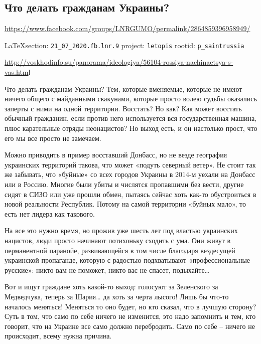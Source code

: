  
 
\subsection{Что делать гражданам Украины?}
\url{https://www.facebook.com/groups/LNRGUMO/permalink/2864859396958949/}
  
\vspace{0.5cm}
{\small\LaTeX section: \verb|21_07_2020.fb.lnr.9| project: \verb|letopis| rootid: \verb|p_saintrussia|}
\vspace{0.5cm}

\url{http://voskhodinfo.su/panorama/ideologiya/56104-rossiya-nachinaetsya-s-vas.htm}l

Что делать гражданам Украины? Тем, которые вменяемые, которые не имеют ничего
общего с майданными скакунами, которые просто волею судьбы оказались заперты с
ними на одной территории. Восстать? Но как? Как может восстать обычный
гражданин, если против него используется вся государственная машина, плюс
карательные отряды неонацистов? Но выход есть, и он настолько прост, что его мы
все просто не замечаем.

Можно приводить в пример восставший Донбасс, но не везде география украинских
территорий такова, что может «подуть северный ветер». Не стоит так же забывать,
что «буйные» со всех городов Украины в 2014-м уехали на Донбасс или в Россию.
Многие были убиты и числятся пропавшими без вести, другие сидят в СИЗО или уже
прошли обмен, пытаясь сейчас хоть как-то обустроиться в новой реальности
Республик. Потому на самой территории «буйных мало», то есть нет лидера как
такового.

На все это нужно время, но прожив уже шесть лет под властью украинских
нацистов, люди просто начинают потихоньку сходить с ума. Они живут в
перманентной паранойе, развивающейся в том числе благодаря вездесущей
украинской пропаганде, которую с радостью подхватывают «профессиональные
русские»: никто вам не поможет, никто вас не спасет, подыхайте…

Вот и ищут граждане хоть какой-то выход: голосуют за Зеленского за Медведчука,
теперь за Шария… да хоть за черта лысого! Лишь бы что-то началось меняться!
Меняться то оно будет, но кто сказал, что в лучшую сторону? Суть в том, что
само по себе ничего не изменится, это надо запомнить и тем, кто говорит, что на
Украине все само должно перебродить. Само по себе – ничего не происходит, всему
нужна причина.

